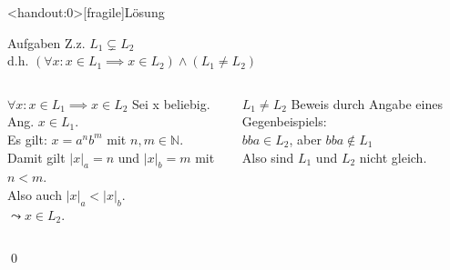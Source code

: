 {
\begin{frame}<handout:0>[fragile]{Lösung}
    \begin{alertblock}{Aufgaben}
    Z.z. $L_1 \subsetneq L_2$\\
    d.h. $(\forall x: x \in L_1 \implies x \in L_2) \wedge (L_1 \neq L_2)$
    \end{alertblock}
    
    \begin{columns}
    \begin{alertblock}{$\forall x: x \in L_1 \implies x \in L_2$}
        Sei x beliebig. Ang. $x \in L_1$.\\
        Es gilt: $x=a^{n}b^{m}$ mit $n,m\in\mathbb{N}$.\\
        Damit gilt $|x|_a=n$ und $|x|_b=m$ mit $n<m$.\\
        Also auch $|x|_a < |x|_b$.\\
        $\leadsto x \in L_2$.
    \end{alertblock}
    
    \begin{alertblock}{$L_1 \neq L_2$}
        Beweis durch Angabe eines Gegenbeispiels:\\
        $bba \in L_2$, aber $bba \notin L_1$\\
        Also sind $L_1$ und $L_2$ nicht gleich.
    \end{alertblock}
    \end{columns}
    \qed
\end{frame}
}

